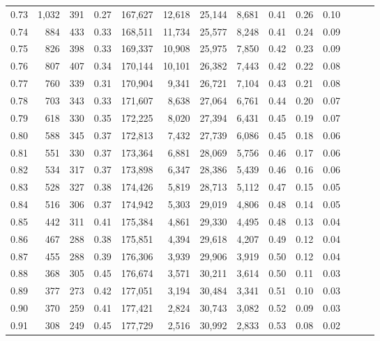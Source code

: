 \begin{tabular}{rrrrrrrrrrrrrr}
0.73 &  1,032 &    391 &  0.27 &  167,627 &   12,618 &  25,144 &   8,681 &  0.41 &  0.26 &      0.10 \\
0.74 &    884 &    433 &  0.33 &  168,511 &   11,734 &  25,577 &   8,248 &  0.41 &  0.24 &      0.09 \\
0.75 &    826 &    398 &  0.33 &  169,337 &   10,908 &  25,975 &   7,850 &  0.42 &  0.23 &      0.09 \\
0.76 &    807 &    407 &  0.34 &  170,144 &   10,101 &  26,382 &   7,443 &  0.42 &  0.22 &      0.08 \\
0.77 &    760 &    339 &  0.31 &  170,904 &    9,341 &  26,721 &   7,104 &  0.43 &  0.21 &      0.08 \\
0.78 &    703 &    343 &  0.33 &  171,607 &    8,638 &  27,064 &   6,761 &  0.44 &  0.20 &      0.07 \\
0.79 &    618 &    330 &  0.35 &  172,225 &    8,020 &  27,394 &   6,431 &  0.45 &  0.19 &      0.07 \\
0.80 &    588 &    345 &  0.37 &  172,813 &    7,432 &  27,739 &   6,086 &  0.45 &  0.18 &      0.06 \\
0.81 &    551 &    330 &  0.37 &  173,364 &    6,881 &  28,069 &   5,756 &  0.46 &  0.17 &      0.06 \\
0.82 &    534 &    317 &  0.37 &  173,898 &    6,347 &  28,386 &   5,439 &  0.46 &  0.16 &      0.06 \\
0.83 &    528 &    327 &  0.38 &  174,426 &    5,819 &  28,713 &   5,112 &  0.47 &  0.15 &      0.05 \\
0.84 &    516 &    306 &  0.37 &  174,942 &    5,303 &  29,019 &   4,806 &  0.48 &  0.14 &      0.05 \\
0.85 &    442 &    311 &  0.41 &  175,384 &    4,861 &  29,330 &   4,495 &  0.48 &  0.13 &      0.04 \\
0.86 &    467 &    288 &  0.38 &  175,851 &    4,394 &  29,618 &   4,207 &  0.49 &  0.12 &      0.04 \\
0.87 &    455 &    288 &  0.39 &  176,306 &    3,939 &  29,906 &   3,919 &  0.50 &  0.12 &      0.04 \\
0.88 &    368 &    305 &  0.45 &  176,674 &    3,571 &  30,211 &   3,614 &  0.50 &  0.11 &      0.03 \\
0.89 &    377 &    273 &  0.42 &  177,051 &    3,194 &  30,484 &   3,341 &  0.51 &  0.10 &      0.03 \\
0.90 &    370 &    259 &  0.41 &  177,421 &    2,824 &  30,743 &   3,082 &  0.52 &  0.09 &      0.03 \\
0.91 &    308 &    249 &  0.45 &  177,729 &    2,516 &  30,992 &   2,833 &  0.53 &  0.08 &      0.02 \\

\end{tabular}
